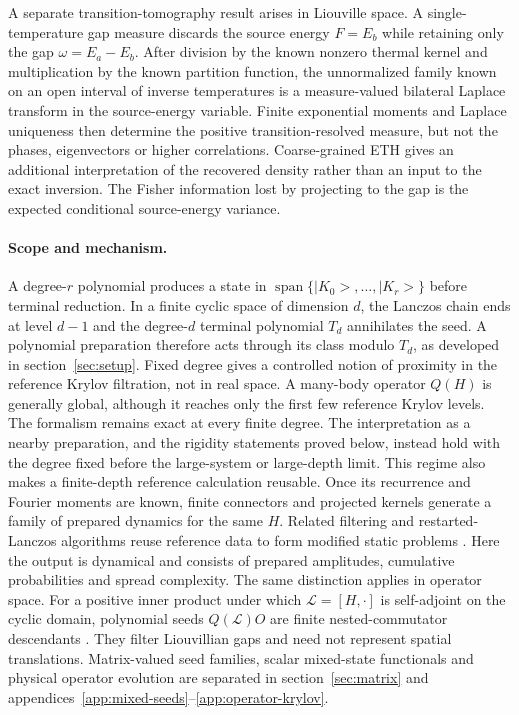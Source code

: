 \documentclass[a4paper,11pt]{article}
\def\ket#1{|#1>}%
\theoremstyle{definition}
\theoremstyle{remark}
\newcommand{\ket}[1]{|#1\rangle}
\newcommand{\Span}{\operatorname{span}}
\begin{document}
\begin{enumerate}[label=\emph{(\roman*)},leftmargin=2.2em,itemsep=4pt,topsep=4pt,parsep=0pt]
A separate transition-tomography result arises in Liouville space.  A single-temperature gap measure discards the source energy $F=E_b$ while retaining only the gap $\omega=E_a-E_b$.  After division by the known nonzero
thermal kernel and multiplication by the known partition function, the unnormalized family known on an open interval of inverse temperatures is a measure-valued bilateral Laplace transform in the source-energy variable.  Finite
exponential moments and Laplace uniqueness then determine the positive transition-resolved
measure, but not the phases, eigenvectors or higher correlations.  Coarse-grained ETH
\cite{Srednicki1999ETH} gives an additional interpretation of the recovered density rather than
an input to the exact inversion.  The Fisher information lost by projecting to the gap is the
expected conditional source-energy variance.

\end{enumerate}

\paragraph{Scope and mechanism.}
A degree-$r$ polynomial produces a state in
$\Span\{\ket{K_0},\ldots,\ket{K_r}\}$ before terminal reduction.
In a finite cyclic space of dimension $d$, the Lanczos chain ends at level $d-1$ and the
degree-$d$ terminal polynomial $T_d$ annihilates the seed.  A polynomial preparation therefore acts
through its class modulo $T_d$, as developed in section~\ref{sec:setup}.
Fixed degree gives a controlled notion of proximity in the reference Krylov filtration, not in real
space.  A many-body operator $Q(H)$ is generally global, although it reaches only the first few
reference Krylov levels.  The formalism remains exact at every finite degree.  The interpretation
as a nearby preparation, and the rigidity statements proved below, instead hold with the degree
fixed before the large-system or large-depth limit. 
This regime also makes a finite-depth reference calculation reusable.  Once its recurrence and
Fourier moments are known, finite connectors and projected kernels generate a family of prepared
dynamics for the same $H$.  Related filtering and restarted-Lanczos algorithms reuse reference
data to form modified static problems \cite{Sorensen1992,LiXiVecharynski2016,GumerovRiggSlevinsky2026}.
Here the output is dynamical and consists of prepared amplitudes, cumulative probabilities and
spread complexity.
The same distinction applies in operator space.  For a positive inner product under which
$\mathcal L=[H,\cdot]$ is self-adjoint on the cyclic domain, polynomial seeds
$Q(\mathcal L)O$ are finite nested-commutator descendants
\cite{Parker2019,Nandy2024,Rabinovici2021Edge,Rabinovici2025}.  They filter Liouvillian gaps and
need not represent spatial translations.  Matrix-valued seed families, scalar mixed-state
functionals and physical operator evolution are separated in section~\ref{sec:matrix} and
appendices~\ref{app:mixed-seeds}--\ref{app:operator-krylov}.
\end{document}
